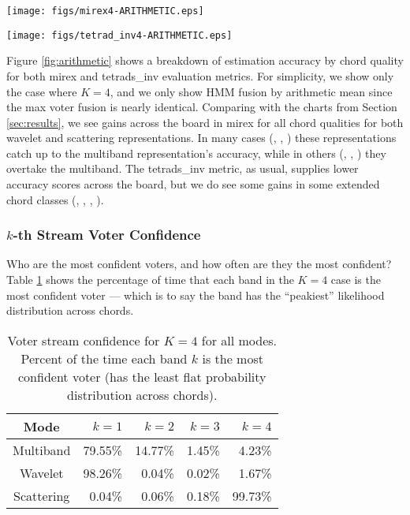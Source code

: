 \begin{figure*}[h!]
\centering
\begin{minipage}{\columnwidth}
	\centering
	\texttt{[image: figs/mirex4-ARITHMETIC.eps]}
\end{minipage}
\begin{minipage}{\columnwidth}
	\centering
	\texttt{[image: figs/tetrad\_inv4-ARITHMETIC.eps]}
\end{minipage}
\caption{Accuracy for $K=4$ for both mirex and tetrads\_inv metrics, both with HMM fusion computed via arithmetic mean.}
\label{fig:arithmetic}
\end{figure*}

Figure \ref{fig:arithmetic} shows a breakdown of estimation accuracy by chord quality for both mirex and tetrads\_inv evaluation metrics. For simplicity, we show only the case where $K=4$, and we only show HMM fusion by arithmetic mean since the max voter fusion is nearly identical. Comparing with the charts from Section \ref{sec:results}, we see gains across the board in mirex for all chord qualities for both wavelet and scattering representations. In many cases (\minor, \7, \susfour) these representations catch up to the multiband representation's accuracy, while in others (\majseven, \augmented, \dimseven) they overtake the multiband. The tetrads\_inv metric, as usual, supplies lower accuracy scores across the board, but we do see some gains in some extended chord classes (\majseven, \sustwo, \augmented, \hdimseven).

\subsubsection{$k$-th Stream Voter Confidence}

Who are the most confident voters, and how often are they the most confident? Table \ref{table:voter-confidence} shows the percentage of time that each band in the $K=4$ case is the most confident voter --- which is to say the band has the ``peakiest'' likelihood distribution across chords. 

\begin{table}
	\begin{center}
	\begin{tabular} {| c | r | r | r | r |}
	\hline
	Mode & $k=1$ & $k=2$ & $k=3$ & $k=4$ \\
	\hline
	Multiband & 79.55\% & 14.77\% & 1.45\% & 4.23\% \\
	Wavelet & 98.26\% &  0.04\% & 0.02\% & 1.67\% \\
	Scattering &  0.04\% & 0.06\% & 0.18\% & 99.73\% \\
	\hline
	\end{tabular}
	\end{center}
	\protect\caption{Voter stream confidence for $K=4$ for all modes. Percent of the time each band $k$ is the most confident voter (\ie has the least flat probability distribution across chords).
	\label{table:voter-confidence}}
\end{table}

